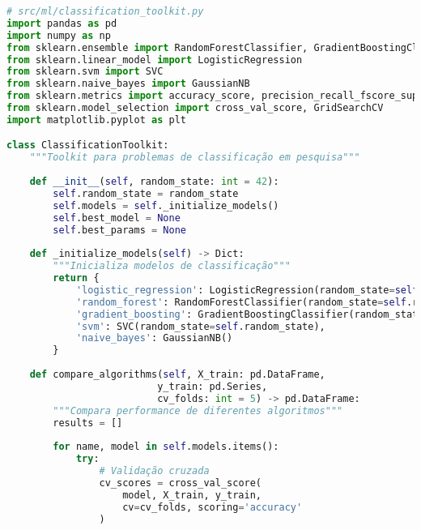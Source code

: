 \begin{pythonbox}
\begin{lstlisting}[language=Python]
# src/ml/classification_toolkit.py
import pandas as pd
import numpy as np
from sklearn.ensemble import RandomForestClassifier, GradientBoostingClassifier
from sklearn.linear_model import LogisticRegression
from sklearn.svm import SVC
from sklearn.naive_bayes import GaussianNB
from sklearn.metrics import accuracy_score, precision_recall_fscore_support
from sklearn.model_selection import cross_val_score, GridSearchCV
import matplotlib.pyplot as plt

class ClassificationToolkit:
    """Toolkit para problemas de classificação em pesquisa"""
    
    def __init__(self, random_state: int = 42):
        self.random_state = random_state
        self.models = self._initialize_models()
        self.best_model = None
        self.best_params = None
        
    def _initialize_models(self) -> Dict:
        """Inicializa modelos de classificação"""
        return {
            'logistic_regression': LogisticRegression(random_state=self.random_state),
            'random_forest': RandomForestClassifier(random_state=self.random_state),
            'gradient_boosting': GradientBoostingClassifier(random_state=self.random_state),
            'svm': SVC(random_state=self.random_state),
            'naive_bayes': GaussianNB()
        }
    
    def compare_algorithms(self, X_train: pd.DataFrame, 
                          y_train: pd.Series,
                          cv_folds: int = 5) -> pd.DataFrame:
        """Compara performance de diferentes algoritmos"""
        results = []
        
        for name, model in self.models.items():
            try:
                # Validação cruzada
                cv_scores = cross_val_score(
                    model, X_train, y_train, 
                    cv=cv_folds, scoring='accuracy'
                )


\end{lstlisting}
\end{pythonbox}
